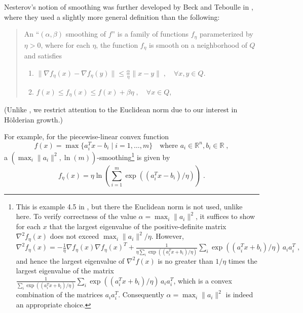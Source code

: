 \documentclass[reqno, 11pt]{amsart}
\numberwithin{equation}{section}
\newcommand{\shrink}[1]{ {\scriptstyle {\textstyle {#1} } } }
\newcommand{\smfrac}[2]{ \shrink{ \frac{#1}{#2} } }
\newcommand{\grad}{\nabla}
\begin{document}
Nesterov's notion of smoothing was further developed by Beck and Teboulle in \cite{beck2012smoothing}, where they used a slightly more general definition than the following:
\begin{quote}
An  ``$ (\alpha, \beta) $ smoothing of $ f $'' is a family of functions $ f_{\eta} $ parameterized by $ \eta > 0 $, where for each $ \eta $, the function $ f_{\eta} $ is smooth on a neighborhood of $ Q $ and satisfies
\begin{enumerate}
\item $ \| \grad f_{\eta}(x) - \grad f_{\eta}(y) \| \leq \smfrac{\alpha }{\eta }  \| x - y \| \; , \quad \forall x,y \in Q $.
\item $ f(x) \leq f_{\eta}(x) \leq f(x) + \beta \eta \; , \quad \forall x \in Q $,
\end{enumerate}
\end{quote}
(Unlike \cite{beck2012smoothing}, we restrict attention to the Euclidean norm due to our interest in H\"{o}lderian growth.)

For example, for the piecewise-linear convex function 
\begin{equation} \label{eqn.bf} 
  f(x) = \max \{ a_i^T x - b_i \mid i = 1, \ldots, m \} \quad \textrm{where  }  a_i \in \mathbb{R}^n,  b_i \in \mathbb{R} \; , 
  \end{equation}
a $ (\max_i \| a_i \|^2, \ln (m)) $-smoothing\footnote{This is example 4.5 in \cite{beck2012smoothing}, but there the Euclidean norm is not used, unlike here. To verify correctness of the value $ \alpha = \max_i \| a_i \|^2 $, it suffices to show for each $ x $ that the largest eigenvalue of the positive-definite matrix $ \nabla^2 f_{\eta}(x) $ does not exceed $ \max_i \| a_i \|^2/ \eta $. However, \\
 $ \nabla^2 f_{\eta}(x) = - \smfrac{1}{\eta } \grad f_{\eta}(x)  \grad f_{\eta}(x)^T  +  \smfrac{1}{ \eta \sum_i \exp ((a_i^T x + b_i)/ \eta ) } \sum_i \exp((a_i^T x + b_i)/\eta) \, a_i a_i^T \; , $     
and hence the largest eigenvalue of $ \nabla^2 f(x) $ is no greater than $ 1/ \eta $ times the largest eigenvalue of the matrix \\
 $ \smfrac{1}{\sum_i \exp ((a_i^T x + b_i)/ \eta ) } \sum_i \exp((a_i^T x + b_i)/\eta) \, a_i a_i^T $, which is a convex combination of the matrices $ a_i a_i^T $.  Consequently $ \alpha = \max_i \| a_i \|^2 $ is indeed an appropriate choice.}
  is given by 
\begin{equation} \label{eqn.bg}
    f_{\eta}(x) = \eta \ln \left( \sum_{i=1}^m \exp ( (a_i^T x - b_i)/ \eta) \right)  \; . 
\end{equation}
     
\end{document}
